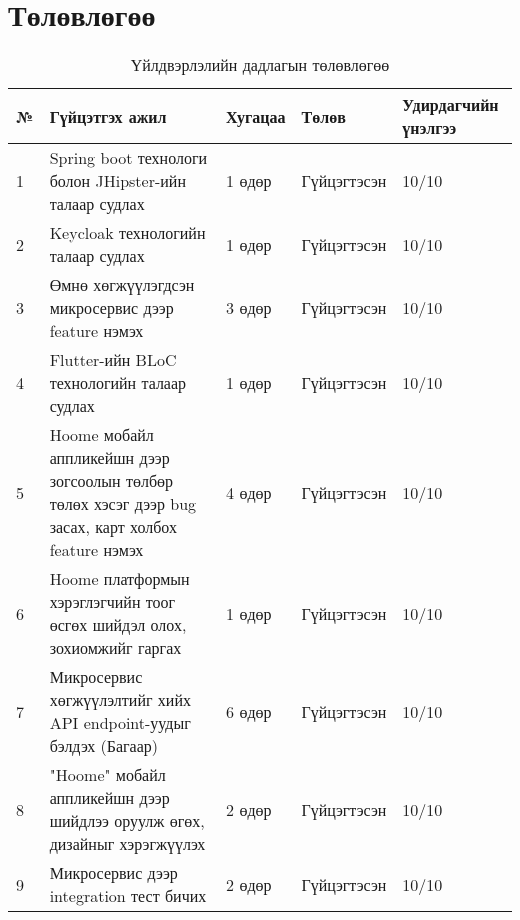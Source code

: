 \chapter{Төлөвлөгөө}
\begin{table}[h]
\caption{Үйлдвэрлэлийн дадлагын төлөвлөгөө}
\begin{tabular}{|p{0.5cm}|p{8cm}|l|l|p{2.5cm}|}
\hline
\textbf{№} & \textbf{Гүйцэтгэх ажил} & \textbf{Хугацаа} & \textbf{Төлөв} & \textbf{Удирдагчийн үнэлгээ} \\ \hline
1 & Spring boot технологи болон JHipster-ийн талаар судлах & 1 өдөр & Гүйцэгтэсэн & 10/10 \\ \hline
2 & Keycloak технологийн талаар судлах & 1 өдөр & Гүйцэгтэсэн & 10/10 \\ \hline
3 & Өмнө хөгжүүлэгдсэн микросервис дээр feature нэмэх & 3 өдөр & Гүйцэгтэсэн & 10/10 \\ \hline
4 & Flutter-ийн BLoC технологийн талаар судлах & 1 өдөр & Гүйцэгтэсэн & 10/10 \\ \hline
5 & Hoome мобайл аппликейшн дээр зогсоолын төлбөр төлөх хэсэг дээр bug засах, карт холбох feature нэмэх & 4 өдөр & Гүйцэгтэсэн & 10/10 \\ \hline
6 & Hoome платформын хэрэглэгчийн тоог өсгөх шийдэл олох, зохиомжийг гаргах & 1 өдөр & Гүйцэгтэсэн & 10/10 \\ \hline
7 & Микросервис хөгжүүлэлтийг хийх API endpoint-уудыг бэлдэх (Багаар) & 6 өдөр & Гүйцэгтэсэн & 10/10 \\ \hline
8 & "Hoome" мобайл аппликейшн дээр шийдлээ оруулж өгөх, дизайныг хэрэгжүүлэх & 2 өдөр & Гүйцэгтэсэн & 10/10 \\ \hline
9 & Микросервис дээр integration тест бичих & 2 өдөр & Гүйцэгтэсэн & 10/10 \\ \hline
\end{tabular}
\end{table}